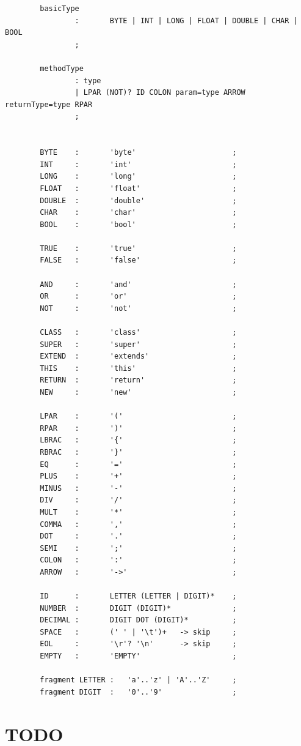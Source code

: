 \documentclass{l4proj}
\begin{document}
\begin{appendices}
\begin{lstlisting}
        basicType
                :       BYTE | INT | LONG | FLOAT | DOUBLE | CHAR | BOOL
                ;

        methodType
                : type
                | LPAR (NOT)? ID COLON param=type ARROW returnType=type RPAR
                ;


        BYTE    :       'byte'                      ;
        INT     :       'int'                       ;
        LONG    :       'long'                      ;
        FLOAT   :       'float'                     ;
        DOUBLE  :       'double'                    ;
        CHAR    :       'char'                      ;
        BOOL    :       'bool'                      ;

        TRUE    :       'true'                      ;
        FALSE   :       'false'                     ;

        AND     :       'and'                       ;
        OR      :       'or'                        ;
        NOT     :       'not'                       ;

        CLASS   :       'class'                     ;
        SUPER   :       'super'                     ;
        EXTEND  :       'extends'                   ;
        THIS    :       'this'                      ;
        RETURN  :       'return'                    ;
        NEW     :       'new'                       ;

        LPAR    :       '('                         ;
        RPAR    :       ')'                         ;
        LBRAC   :       '{'                         ;
        RBRAC   :       '}'                         ;
        EQ      :       '='                         ;
        PLUS    :       '+'                         ;
        MINUS   :       '-'                         ;
        DIV     :       '/'                         ;
        MULT    :       '*'                         ;
        COMMA   :       ','                         ;
        DOT     :       '.'                         ;
        SEMI    :       ';'                         ;
        COLON   :       ':'                         ;
        ARROW   :       '->'                        ;

        ID      :       LETTER (LETTER | DIGIT)*    ;
        NUMBER  :       DIGIT (DIGIT)*              ;
        DECIMAL :       DIGIT DOT (DIGIT)*          ;
        SPACE   :       (' ' | '\t')+   -> skip     ;
        EOL     :       '\r'? '\n'      -> skip     ;
        EMPTY   :       'EMPTY'                     ;

        fragment LETTER :   'a'..'z' | 'A'..'Z'     ;
        fragment DIGIT  :   '0'..'9'                ;
    \end{lstlisting}

    \chapter{TODO}

\end{appendices}





\end{document}
